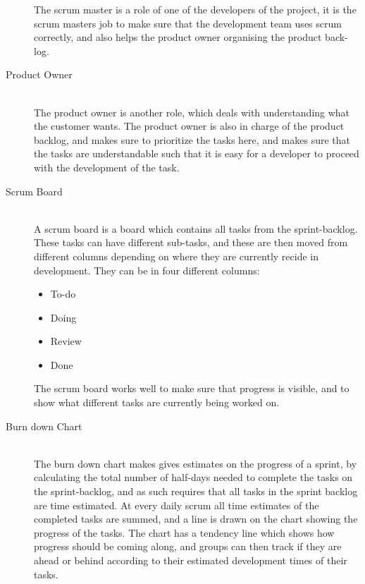 \begin{description}
	The scrum master is a role of one of the developers of the project, it is the scrum masters job to make sure that the development team uses scrum correctly, and also helps the product owner organising the product back-log.
	\item[Product Owner] \hfill \\
	The product owner is another role, which deals with understanding what the customer wants.
	The product owner is also in charge of the product backlog, and makes sure to prioritize the tasks here, and makes sure that the tasks are understandable such that it is easy for a developer to proceed with the development of the task.
	\item[Scrum Board] \hfill \\
	A scrum board is a board which contains all tasks from the sprint-backlog.
	These tasks can have different sub-tasks, and these are then moved from different columns depending on where they are currently recide in development.
	They can be in four different columns:
	\begin{itemize}
		\item To-do
		\item Doing
		\item Review
		\item Done
	\end{itemize}
	The scrum board works well to make sure that progress is visible, and to show what different tasks are currently being worked on.
	\item[Burn down Chart] \hfill \\
	The burn down chart makes gives estimates on the progress of a sprint, by calculating the total number of half-days needed to complete the tasks on the sprint-backlog, and as such requires that all tasks in the sprint backlog are time estimated.
	At every daily scrum all time estimates of the completed tasks are summed, and a line is drawn on the chart showing the progress of the tasks.
	The chart has a tendency line which shows how progress should be coming along, and groups can then track if they are ahead or behind according to their estimated development times of their tasks.
\end{description}

